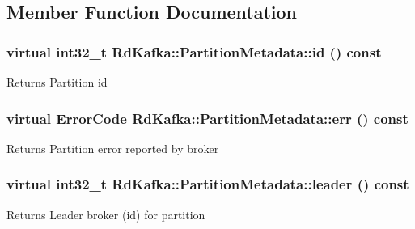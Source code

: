 \subsection{Member Function Documentation}
\hypertarget{classRdKafka_1_1PartitionMetadata_a70b1781ddc5ecc3998158ef970b678a0}{
\subsubsection[{id}]{\setlength{\rightskip}{0pt plus 5cm}virtual int32\_\-t RdKafka::PartitionMetadata::id () const}}
\label{classRdKafka_1_1PartitionMetadata_a70b1781ddc5ecc3998158ef970b678a0}
\begin{DoxyReturn}{Returns}
Partition id 
\end{DoxyReturn}
\hypertarget{classRdKafka_1_1PartitionMetadata_ac7328782aefb58521598ee19ed7857ca}{
\subsubsection[{err}]{\setlength{\rightskip}{0pt plus 5cm}virtual ErrorCode RdKafka::PartitionMetadata::err () const}}
\label{classRdKafka_1_1PartitionMetadata_ac7328782aefb58521598ee19ed7857ca}
\begin{DoxyReturn}{Returns}
Partition error reported by broker 
\end{DoxyReturn}
\hypertarget{classRdKafka_1_1PartitionMetadata_aead184554d4e2c57b670b2e07b5592eb}{
\subsubsection[{leader}]{\setlength{\rightskip}{0pt plus 5cm}virtual int32\_\-t RdKafka::PartitionMetadata::leader () const}}
\label{classRdKafka_1_1PartitionMetadata_aead184554d4e2c57b670b2e07b5592eb}
\begin{DoxyReturn}{Returns}
Leader broker (id) for partition 
\end{DoxyReturn}
